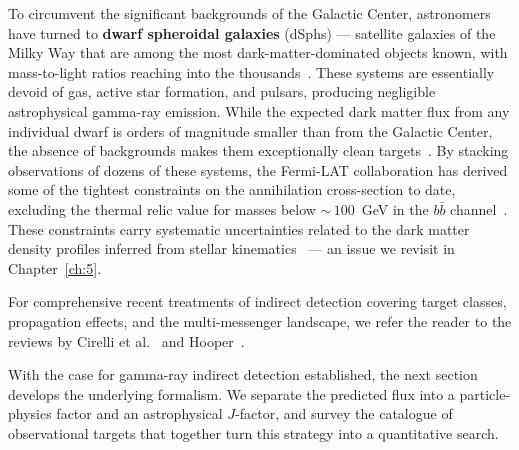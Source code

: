 To circumvent the significant backgrounds of the Galactic Center, astronomers have turned to \textbf{dwarf spheroidal galaxies} (dSphs) --- satellite galaxies of the Milky Way that are among the most dark-matter-dominated objects known, with mass-to-light ratios reaching into the thousands~\cite{Fermi-LAT:2015att}.
These systems are essentially devoid of gas, active star formation, and pulsars, producing negligible astrophysical gamma-ray emission.
While the expected dark matter flux from any individual dwarf is orders of magnitude smaller than from the Galactic Center, the absence of backgrounds makes them exceptionally clean targets~\cite{Hooper:2024}.
By stacking observations of dozens of these systems, the Fermi-LAT collaboration has derived some of the tightest constraints on the annihilation cross-section to date, excluding the thermal relic value for masses below ${\sim}\,100$~GeV in the $b\bar{b}$ channel~\cite{Fermi-LAT:2015att,Hooper:2024}.
These constraints carry systematic uncertainties related to the dark matter density profiles inferred from stellar kinematics~\cite{Bonnivard:2015xpq} --- an issue we revisit in Chapter~\ref{ch:5}.

For comprehensive recent treatments of indirect detection covering target classes, propagation effects, and the multi-messenger landscape, we refer the reader to the reviews by Cirelli et al.~\cite{Cirelli:2024ssz} and Hooper~\cite{Hooper:2024}.

With the case for gamma-ray indirect detection established, the next section develops the underlying formalism.
We separate the predicted flux into a particle-physics factor and an astrophysical $J$-factor, and survey the catalogue of observational targets that together turn this strategy into a quantitative search.
